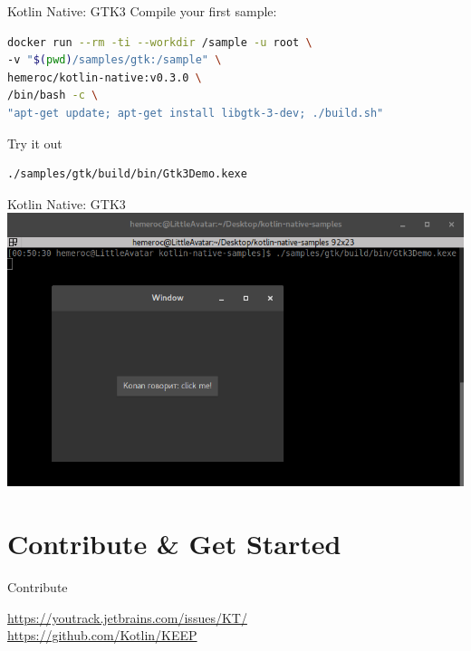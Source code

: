 \begin{frame}[fragile]{Kotlin Native: GTK3}
	Compile your first sample:\\\vspace{.5\baselineskip}
\begin{lstlisting}[language=bash,basicstyle=\ttfamily\small]
docker run --rm -ti --workdir /sample -u root \
-v "$(pwd)/samples/gtk:/sample" \
hemeroc/kotlin-native:v0.3.0 \
/bin/bash -c \
"apt-get update; apt-get install libgtk-3-dev; ./build.sh"
\end{lstlisting}
	Try it out\\\vspace{.5\baselineskip}
\begin{lstlisting}[language=bash,basicstyle=\ttfamily\small]
./samples/gtk/build/bin/Gtk3Demo.kexe
\end{lstlisting}
\end{frame}

\begin{frame}[fragile]{Kotlin Native: GTK3}
	\includegraphics[width=0.85\paperwidth]{figures/gtk3}
\end{frame}

\section{Contribute \& Get Started}

\begin{frame}{Contribute}
	\begin{center}
		\LARGE \href{https://youtrack.jetbrains.com/issues/KT/}{https://youtrack.jetbrains.com/issues/KT/}\\
		\href{https://github.com/Kotlin/KEEP}{https://github.com/Kotlin/KEEP}
	\end{center}
\end{frame}

